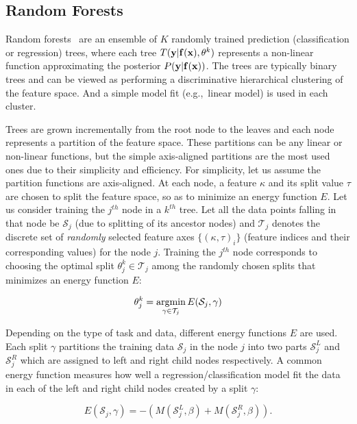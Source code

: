 \subsection{Random Forests}
\label{sec:forests}

Random forests~\cite{breiman2001random,ho1995random}
are an ensemble of $K$ randomly trained prediction (classification or regression)
trees, where each tree $T(\mathbf{y}|\mathbf{f}(\mathbf{x}),\mathbf{\theta}^k)$ represents a non-linear
function approximating the posterior $P(\mathbf{y}|\mathbf{f}(\mathbf{x}))$.
The trees are typically binary trees and can be viewed as performing a
discriminative hierarchical clustering of the feature space.
And a simple model fit (e.g.,\ linear model) is used in each cluster.

Trees are grown incrementally from the root node to the leaves and
each node represents a partition of the feature space. These partitions can be any linear
or non-linear functions, but the simple axis-aligned partitions are the most used ones
due to their simplicity and efficiency. For simplicity, let us assume the partition functions
are axis-aligned. At each node, a feature $\kappa$ and
its split value $\tau$ are chosen to split the feature space,
so as to minimize an energy function $E$. Let us
consider training the $j^{th}$ node in a $k^{th}$ tree. Let all the data points falling
in that node be $\mathcal{S}_j$ (due to splitting of its ancestor nodes)
and $\mathcal{T}_j$ denotes the discrete set of
\textit{randomly} selected feature axes $\{(\kappa,\tau)_i\}$
(feature indices and their corresponding values)
for the node $j$. Training the $j^{th}$ node corresponds to choosing the optimal
split $\theta^k_j \in \mathcal{T}_j$ among the randomly chosen splits that
minimizes an energy function $E$:

\begin{equation}
\theta^k_j = \argmin_{\gamma \in \mathcal{T}_j} E(\mathcal{S}_j,\gamma)
\end{equation}

Depending on the type of task and data, different energy functions $E$ are
used. Each split $\gamma$ partitions the training data $\mathcal{S}_j$ in
the node $j$ into two parts $\mathcal{S}^L_j$ and $\mathcal{S}^R_j$ which are
assigned to left and right child nodes respectively.
A common energy function measures how well a regression/classification model
fit the data in each of the left and right child nodes created by a split $\gamma$:

\begin{equation}
E(\mathcal{S}_j,\gamma) = - (M(\mathcal{S}^L_j, \beta) + M(\mathcal{S}^R_j, \beta)).
\label{eqn:forest_energy}
\end{equation}


